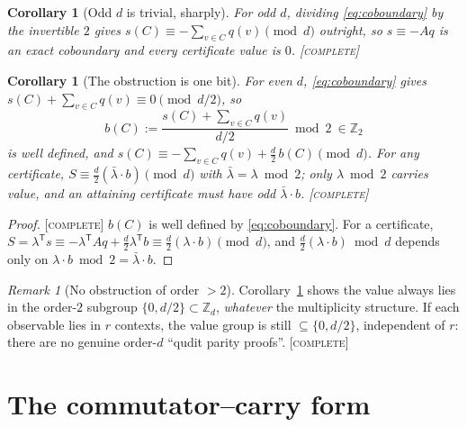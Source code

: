 \documentclass[11pt]{article}
\newtheorem{corollary}[theorem]{Corollary}
\theoremstyle{definition}
\theoremstyle{remark}
\newtheorem{remark}[theorem]{Remark}
\newcommand{\Z}{\mathbb{Z}}
\newcommand{\Zd}{\Z_d}
\newcommand{\CO}{\textnormal{\textsc{[complete]}}}
\begin{document}
\begin{corollary}[Odd $d$ is trivial, sharply]\label{cor:odd}
For odd $d$, dividing \eqref{eq:coboundary} by the invertible $2$ gives $s(C)\equiv-\sum_{v\in
C}q(v)\pmod d$ outright, so $s\equiv-Aq$ is an exact coboundary and every certificate value is $0$.
\CO
\end{corollary}

\begin{corollary}[The obstruction is one bit]\label{cor:bit}
For even $d$, \eqref{eq:coboundary} gives $s(C)+\sum_{v\in C}q(v)\equiv0\pmod{d/2}$, so
\[
b(C):=\frac{s(C)+\sum_{v\in C}q(v)}{d/2}\bmod2\ \in\Z_2
\]
is well defined, and $s(C)\equiv-\sum_{v\in C}q(v)+\tfrac d2\,b(C)\pmod d$. For any certificate,
$S\equiv\tfrac d2(\bar\lambda\cdot b)\pmod d$ with $\bar\lambda=\lambda\bmod2$; only $\lambda\bmod2$
carries value, and an attaining certificate must have odd $\bar\lambda\cdot b$. \CO
\end{corollary}
\begin{proof}
\CO{} $b(C)$ is well defined by \eqref{eq:coboundary}. For a certificate,
$S=\lambda^{\mathsf T}s\equiv-\lambda^{\mathsf T}Aq+\tfrac d2\lambda^{\mathsf T}b\equiv\tfrac d2
(\lambda\cdot b)\pmod d$, and $\tfrac d2(\lambda\cdot b)\bmod d$ depends only on $\lambda\cdot b\bmod
2=\bar\lambda\cdot b$.
\end{proof}

\begin{remark}[No obstruction of order $>2$]\label{rem:nohigher}
Corollary~\ref{cor:bit} shows the value always lies in the order-$2$ subgroup
$\{0,d/2\}\subset\Zd$, \emph{whatever} the multiplicity structure. If each observable lies in $r$
contexts, the value group is still $\subseteq\{0,d/2\}$, independent of $r$: there are no genuine
order-$d$ ``qudit parity proofs''. \CO
\end{remark}

\section{The commutator--carry form}\label{sec:carry}
\end{document}

